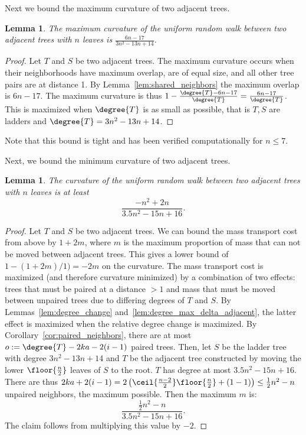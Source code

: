 \documentclass{amsart}
\newtheorem{lemma}[theorem]{Lemma}
\begin{document}
Next we bound the maximum curvature of two adjacent trees.

\begin{lemma}
	The maximum curvature of the uniform random walk between two adjacent trees with $n$ leaves is $\frac{6n-17}{3n^2-13n+14}$. 
\end{lemma}
\begin{proof}
Let $T$ and $S$ be two adjacent trees.
The maximum curvature occurs when their neighborhoods have maximum overlap, are of equal size, and all other tree pairs are at distance 1.
By Lemma~\ref{lem:shared_neighbors} the maximum overlap is $6n-17$.
The maximum curvature is thus $1 - \frac{\degree{T} - 6n-17}{\degree{T}} = \frac{6n - 17}{\degree{T}}$. This is maximized when $\degree{T}$ is as small as possible, that is $T,S$ are ladders and $\degree{T} = 3n^2 - 13n + 14$.
\end{proof}

Note that this bound is tight and has been verified computationally for $n \le 7$.

Next, we bound the minimum curvature of two adjacent trees.

\begin{lemma}
	The curvature of the uniform random walk between two adjacent trees with $n$ leaves is at least
	$$\frac{-n^2 + 2n}{3.5n^2 - 15n + 16}.$$
\end{lemma}
\begin{proof}
	Let $T$ and $S$ be two adjacent trees.
	We can bound the mass transport cost from above by $1 + 2m$, where $m$ is the maximum proportion of mass that can not be moved between adjacent trees.
	This gives a lower bound of $1 - (1 + 2m) / 1) = -2m$ on the curvature.
	The mass transport cost is maximized (and therefore curvature minimized) by a combination of two effects: trees that must be paired at a distance $>1$ and mass that must be moved between unpaired trees due to differing degrees of $T$ and $S$.
	By Lemmas~\ref{lem:degree_change} and~\ref{lem:degree_max_delta_adjacent}, the latter effect is maximized when the relative degree change is maximized.
	By Corollary~\ref{cor:paired_neighbors}, there are at most $o := \degree{T} -2ka - 2(i-1)$ paired trees.
	Then, let $S$ be the ladder tree with degree $3n^2 - 13n + 14$ and $T$ be the adjacent tree constructed by moving the lower $\floor{\frac{n}{2}}$ leaves of $S$ to the root.
	$T$ has degree at most $3.5n^2 -15n + 16$.
	There are thus $2ka + 2(i-1) = 2\left(\ceil{\frac{n-2}{2}}\floor{\frac{n}{2}} +(1-1)\right) \le \frac{1}{2}n^2 - n$ unpaired neighbors, the maximum possible.
	Then the maximum $m$ is:
	$$\frac{\frac{1}{2}n^2 - n}{3.5n^2 - 15n + 16}.$$
	The claim follows from multiplying this value by $-2$.
\end{proof}
\end{document}
